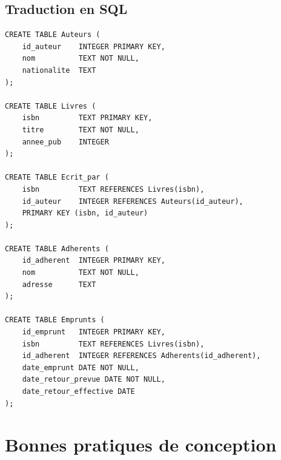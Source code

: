 \begin{center}
\end{center}

\subsection{Traduction en SQL}

\begin{codeblock}[title=\textbf{Sch\'ema relationnel de la biblioth\`eque}]
\begin{verbatim}
CREATE TABLE Auteurs (
    id_auteur    INTEGER PRIMARY KEY,
    nom          TEXT NOT NULL,
    nationalite  TEXT
);

CREATE TABLE Livres (
    isbn         TEXT PRIMARY KEY,
    titre        TEXT NOT NULL,
    annee_pub    INTEGER
);

CREATE TABLE Ecrit_par (
    isbn         TEXT REFERENCES Livres(isbn),
    id_auteur    INTEGER REFERENCES Auteurs(id_auteur),
    PRIMARY KEY (isbn, id_auteur)
);

CREATE TABLE Adherents (
    id_adherent  INTEGER PRIMARY KEY,
    nom          TEXT NOT NULL,
    adresse      TEXT
);

CREATE TABLE Emprunts (
    id_emprunt   INTEGER PRIMARY KEY,
    isbn         TEXT REFERENCES Livres(isbn),
    id_adherent  INTEGER REFERENCES Adherents(id_adherent),
    date_emprunt DATE NOT NULL,
    date_retour_prevue DATE NOT NULL,
    date_retour_effective DATE
);
\end{verbatim}
\end{codeblock}

\section{Bonnes pratiques de conception}

